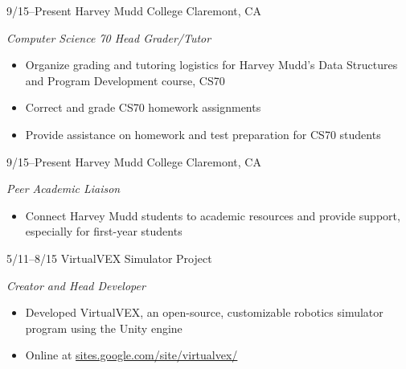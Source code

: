 \documentclass[print]{friggeri-cv} %
\begin{document}
\begin{entrylist}

\entry
{9/15--Present}
{Harvey Mudd College}
{Claremont, CA}
{\emph{Computer Science 70 Head Grader/Tutor}
\begin{itemize}
\item Organize grading and tutoring logistics for Harvey Mudd's Data Structures and Program Development course, CS70
\item Correct and grade CS70 homework assignments
\item Provide assistance on homework and test preparation for CS70 students
\end{itemize}}


\entry
{9/15--Present}
{Harvey Mudd College}
{Claremont, CA}
{\emph{Peer Academic Liaison}
\begin{itemize}
\item Connect Harvey Mudd students to academic resources and provide support, especially for first-year students
\end{itemize}}


\entry
{5/11--8/15}
{VirtualVEX Simulator Project}
{}
{\emph{Creator and Head Developer}
\begin{itemize}
\item Developed VirtualVEX, an open-source, customizable robotics simulator program using the Unity engine
\item Online at \href{https://sites.google.com/site/virtualvex/}{sites.google.com/site/virtualvex/}
\end{itemize}}

\end{entrylist}
\end{document}
